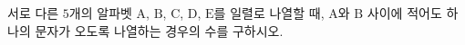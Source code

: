 서로 다른 $5$개의 알파벳 $\mathrm{A}$, $\mathrm{B}$, $\mathrm{C}$, $\mathrm{D}$, $\mathrm{E}$를 일렬로 나열할 때, $\mathrm{A}$와 $\mathrm{B}$ 사이에 적어도 하나의 문자가 오도록 나열하는 경우의 수를 구하시오.

